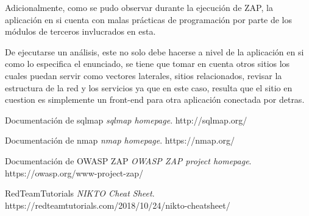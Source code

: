 \documentclass[11pt]{utalcaDoc}
\begin{document}
Adicionalmente, como se pudo observar durante la ejecución de ZAP, la aplicación en si cuenta con malas prácticas de programación por parte de los módulos de terceros invlucrados en esta.

De ejecutarse un análisis, este no solo debe hacerse a nivel de la aplicación en si como lo especifica el enunciado, se tiene que tomar en cuenta otros sitios los cuales puedan servir como vectores laterales, sitios relacionados, revisar la estructura de la red y los servicios ya que en este caso, resulta que el sitio en cuestion es simplemente un front-end para otra aplicación conectada por detras.

\begin{thebibliography}{9}

	Documentación de sqlmap
	\textit{sqlmap homepage}.
	http://sqlmap.org/

	Documentación de nmap
	\textit{nmap homepage}.
	https://nmap.org/

	Documentación de OWASP ZAP
	\textit{OWASP ZAP project homepage}.
	https://owasp.org/www-project-zap/


	RedTeamTutorials
	\textit{NIKTO Cheat Sheet}.
	https://redteamtutorials.com/2018/10/24/nikto-cheatsheet/
\end{thebibliography}
\end{document}
